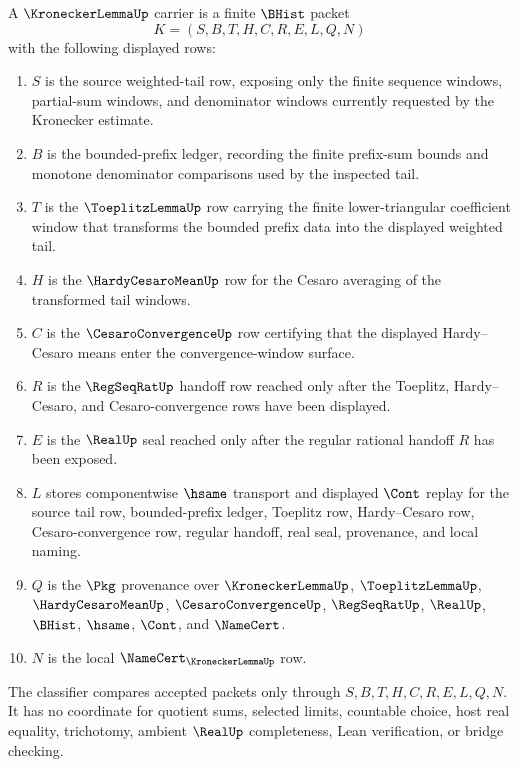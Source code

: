 \begin{definition}\label{def:kronecker-lemma-carrier}
A $\KroneckerLemmaUp$ carrier is a finite $\BHist$ packet
$$
K=(S,B,T,H,C,R,E,L,Q,N)
$$
with the following displayed rows:
\begin{enumerate}
\item $S$ is the source weighted-tail row, exposing only the finite sequence windows, partial-sum windows, and denominator windows currently requested by the Kronecker estimate.
\item $B$ is the bounded-prefix ledger, recording the finite prefix-sum bounds and monotone denominator comparisons used by the inspected tail.
\item $T$ is the $\ToeplitzLemmaUp$ row carrying the finite lower-triangular coefficient window that transforms the bounded prefix data into the displayed weighted tail.
\item $H$ is the $\HardyCesaroMeanUp$ row for the Cesaro averaging of the transformed tail windows.
\item $C$ is the $\CesaroConvergenceUp$ row certifying that the displayed Hardy--Cesaro means enter the convergence-window surface.
\item $R$ is the $\RegSeqRatUp$ handoff row reached only after the Toeplitz, Hardy--Cesaro, and Cesaro-convergence rows have been displayed.
\item $E$ is the $\RealUp$ seal reached only after the regular rational handoff $R$ has been exposed.
\item $L$ stores componentwise $\hsame$ transport and displayed $\Cont$ replay for the source tail row, bounded-prefix ledger, Toeplitz row, Hardy--Cesaro row, Cesaro-convergence row, regular handoff, real seal, provenance, and local naming.
\item $Q$ is the $\Pkg$ provenance over $\KroneckerLemmaUp$, $\ToeplitzLemmaUp$, $\HardyCesaroMeanUp$, $\CesaroConvergenceUp$, $\RegSeqRatUp$, $\RealUp$, $\BHist$, $\hsame$, $\Cont$, and $\NameCert$.
\item $N$ is the local $\NameCert_{\KroneckerLemmaUp}$ row.
\end{enumerate}
The classifier compares accepted packets only through $S,B,T,H,C,R,E,L,Q,N$. It has no coordinate for quotient sums, selected limits, countable choice, host real equality, trichotomy, ambient $\RealUp$ completeness, Lean verification, or bridge checking.
\end{definition}


